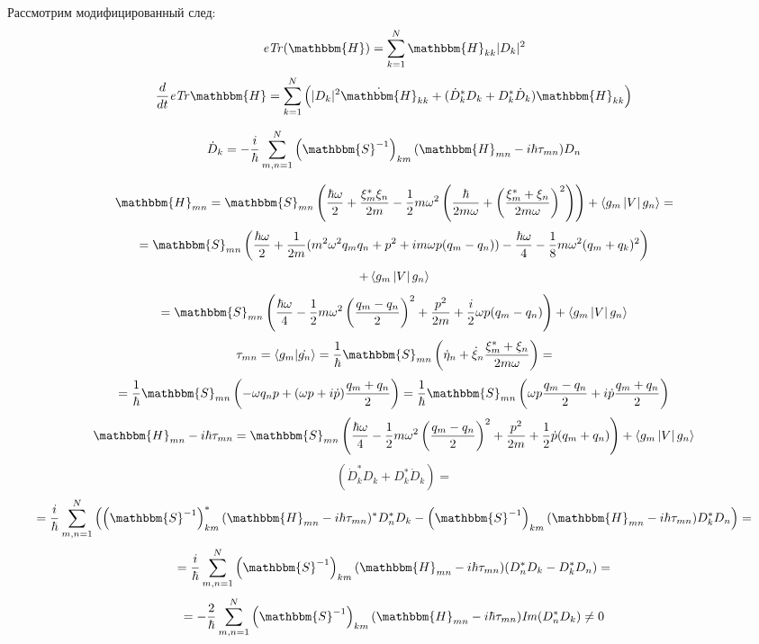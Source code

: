 Рассмотрим модифицированный след:
$$\mathit{eTr}(\mathbbm{H})=\sum_{k=1}^N\mathbbm{H}_{kk}|D_k|^2$$
$$\frac{d}{dt}\mathit{eTr}\mathbbm{H} = \sum_{k=1}^N\left(|D_k|^2\dot{\mathbbm{H}}_{kk}+%
							 (\dot{D}_k^*D_k+D_k^*\dot{D}_k)\mathbbm{H}_{kk}\right)$$

$$\dot{D}_k=-\frac{i}{\hbar}\sum_{m,n=1}^N\left(\mathbbm{S}^{-1}\right)_{km}%
					  (\mathbbm{H}_{mn}-i\hbar\tau_{mn})D_n$$

$$\mathbbm{H}_{mn} = \mathbbm{S}_{mn}\left(\frac{\hbar\omega}{2}+\frac{\xi_m^*\xi_n}{2m}-%
					   \frac{1}{2}m\omega^2\left(\frac{\hbar}{2m\omega}+\left(\frac{\xi_m^*+\xi_n}{2m\omega}\right)^2\right)\right)+
		     \mymean{g_m}{V}{g_n}=$$
$$=\mathbbm{S}_{mn}\left(\frac{\hbar\omega}{2}+\frac{1}{2m}(m^2\omega^2 q_mq_n+p^2+im\omega p(q_m-q_n))-%
			 	\frac{\hbar\omega}{4}-\frac{1}{8}m\omega^2(q_m+q_k)^2\right)$$
$$+\left\langle g_m \left| V \right| g_n \right\rangle$$
$$=\mathbbm{S}_{mn}\left(\frac{\hbar\omega}{4}-%
			 \frac{1}{2}m\omega^2\left(\frac{q_m-q_n}{2}\right)^2+%
			 \frac{p^2}{2m}+%
			 \frac{i}{2}\omega p(q_m-q_n)\right)+\mymean{g_m}{V}{g_n}$$
$$\tau_{mn} = \myint{g_m}{\dot{g_n}} = \frac{1}{\hbar}\mathbbm{S}_{mn}\left(\dot{\eta}_n+\dot{\xi}_n\frac{\xi_m^*+\xi_n}{2m\omega}\right)=$$
$$=\frac{1}{\hbar}\mathbbm{S}_{mn}\left(-\omega q_np+(\omega p+i\dot{p})\frac{q_m+q_n}{2}\right)=%
   \frac{1}{\hbar}\mathbbm{S}_{mn}\left(\omega p\frac{q_m-q_n}{2}+i\dot{p}\frac{q_m+q_n}{2}\right)$$
$$\mathbbm{H}_{mn}-i\hbar\tau_{mn}=\mathbbm{S}_{mn}\left(\frac{\hbar\omega}{4}-%
							 \frac{1}{2}m\omega^2\left(\frac{q_m-q_n}{2}\right)^2+%
							 \frac{p^2}{2m}+%
							 \frac{1}{2}\dot{p}(q_m+q_n)\right)+\mymean{g_m}{V}{g_n}$$
$$\left(\dot{D}_k^*D_k+D_k^*\dot{D}_k\right)=$$
$$=\frac{i}{\hbar}\sum_{m,n=1}^N%
   \left(\left(\mathbbm{S}^{-1}\right)^*_{km}(\mathbbm{H}_{mn}-i\hbar\tau_{mn})^*D_n^*D_k-%
	 \left(\mathbbm{S}^{-1}\right)_{km}(\mathbbm{H}_{mn}-i\hbar\tau_{mn})D_k^*D_n\right)=$$
$$=\frac{i}{\hbar}\sum_{m,n=1}^N\left(\mathbbm{S}^{-1}\right)_{km}(\mathbbm{H}_{mn}-i\hbar\tau_{mn})(D_n^*D_k-D_k^*D_n)=$$
$$=-\frac{2}{\hbar}\sum_{m,n=1}^N\left(\mathbbm{S}^{-1}\right)_{km}(\mathbbm{H}_{mn}-i\hbar\tau_{mn})\mathit{Im}(D_n^*D_k)\neq 0$$

